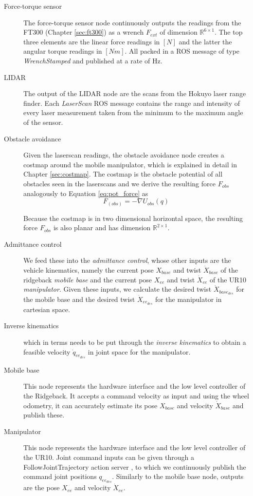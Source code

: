 \begin{description}
  \item[Force-torque sensor] The force-torque sensor node continuously outputs the readings from the FT300 (Chapter \ref{sec:ft300}) as a wrench $F_{ext}$ of dimension $\mathbb{R}^{6 \times 1}$. The top three elements are the linear force readings in $[N]$ and the latter the angular torque readings in $[Nm]$. All packed in a ROS message of type \emph{WrenchStamped} \citep{rosWrench} and published at a rate of \unit[100]{Hz}. 
  \item[LIDAR] The output of the LIDAR node are the scans from the Hokuyo laser range finder. Each \emph{LaserScan} ROS message \citep{rosLaserscan} contains the range and intensity of every laser measurement taken from the minimum to the maximum angle of the sensor.
  \item[Obstacle avoidance] Given the laserscan readings, the obstacle avoidance node creates a costmap \citep{rosCostmap} around the mobile manipulator, which is explained in detail in Chapter \ref{sec:costmap}. The costmap is the obstacle potential of all obstacles seen in the laserscans and we derive the resulting force $F_{obs}$ analogously to Equation \ref{eq:pot_force} as
  \begin{equation}
  F_(obs) = - \nabla U_{obs}(q)
  \end{equation}
  
  Because the costmap is in two dimensional horizontal space, the resulting force $F_{obs}$ is also planar and has dimension $\mathbb{R}^{2 \times 1}$. 
  
  \item[Admittance control] We feed these into the \emph{admittance control}, whose other inputs are the vehicle kinematics, namely the current pose $X_{base}$ \citep{rosPose} and twist $\dot{X}_{base}$ \citep{rosTwist} of the ridgeback \emph{mobile base} and the current pose $X_{ee}$ and twist $\dot{X}_{ee}$ of the UR10 \emph{manipulator}. Given these inputs, we calculate the desired twist $\dot{X}_{base_{des}}$ for the mobile base and the desired twist $\dot{X}_{ee_{des}}$ for the manipulator in cartesian space.
  
  \item[Inverse kinematics] which in terms needs to be put through the \emph{inverse kinematics} to obtain a feasible velocity $\dot{q}_{ee_{des}}$ in joint space for the manipulator.
  \item[Mobile base] This node represents the hardware interface and the low level controller of the Ridgeback. It accepts a command velocity as input and using the wheel odometry, it can accurately estimate its pose $X_{base}$ and velocity $\dot{X}_{base}$ and publish these.
  \item[Manipulator] This node represents the hardware interface and the low level controller of the UR10. Joint command inputs can be given through a FollowJointTrajectory action server \citep{rosJointTrajectory}, to which we continuously publish the command joint positions $q_{ee_{des}}$. Similarly to the mobile base node, outputs are the pose $X_{ee}$ and velocity $\dot{X}_{ee}$.
\end{description}

